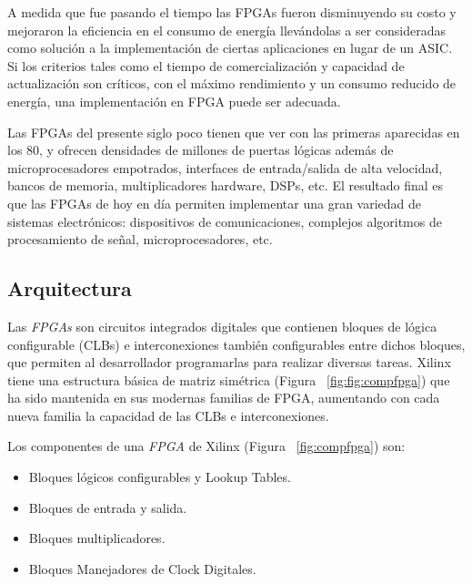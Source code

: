 	\par
	A medida que fue pasando el tiempo las FPGAs fueron disminuyendo su costo y mejoraron la eficiencia en el consumo de energía llevándolas a ser
	consideradas como solución a la implementación de ciertas aplicaciones en lugar de un ASIC. Si los criterios tales como el tiempo de
	comercialización y capacidad de actualización son críticos, con el máximo rendimiento y un consumo reducido de energía, una implementación en FPGA
	puede ser adecuada.
	\vspace{0.5cm}
	\par
	Las FPGAs del presente siglo poco tienen que ver con las primeras aparecidas en los 80, y ofrecen densidades de millones de puertas lógicas además
	de microprocesadores empotrados, interfaces de entrada/salida de alta velocidad, bancos de memoria, multiplicadores hardware, DSPs, etc. El
	resultado final es que las FPGAs de hoy en día permiten implementar una gran variedad de sistemas electrónicos: dispositivos de comunicaciones,
	complejos algoritmos de procesamiento de señal, microprocesadores, etc.

	\subsection{Arquitectura}
    \par
	Las \textit{FPGAs} son circuitos integrados digitales que contienen bloques de lógica configurable (CLBs) e interconexiones también configurables entre dichos
	bloques, que permiten al desarrollador programarlas para realizar diversas tareas. Xilinx tiene una estructura básica de matriz simétrica (Figura
	~\ref{fig:fig:compfpga}) que ha sido mantenida en sus modernas familias de FPGA, aumentando con cada nueva familia la capacidad de las CLBs e
	interconexiones.
	\vspace{0.5cm}
	\par
	Los componentes de una \textit{FPGA} de Xilinx (Figura ~\ref{fig:compfpga}) son:

	\begin {itemize}
	\item  Bloques lógicos configurables y Lookup Tables.
	\item  Bloques de entrada y salida.
	\item  Bloques multiplicadores.
	\item  Bloques Manejadores de Clock Digitales.
	\end {itemize}

